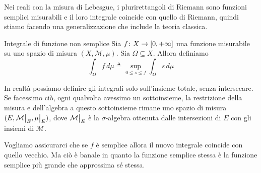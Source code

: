 \documentclass[a4paper]{article}
\begin{document}
\begin{radioactive}
Nei reali con la misura di Lebesgue, i plurirettangoli di Riemann
sono funzioni semplici misurabili e il loro integrale coincide con quello di Riemann,
quindi stiamo facendo una generalizzazione che include la teoria classica.
\end{radioactive}

\begin{radioactive}
\begin{snippetdefinition}{Integrale di funzione non semplice}
    Sia \(f \colon X \to [0, +\infty]\)
    una funzione misurabile
    su uno spazio di misura \((X, \mathcal M, \mu)\). Sia \(\Omega \subseteq X\).
    Allora definiamo
    \[
        \int_\Omega f\,d\mu \triangleq
        \sup_{0\leq s \leq f} \int_\Omega s\,d\mu
    \]
\end{snippetdefinition}
\end{radioactive}

\begin{radioactive}
In realtà possiamo definire gli integrali solo sull'insieme totale,
senza intersecare. Se facessimo ciò, ogni qualvolta avessimo un sottoinsieme,
la restrizione della misura e dell'algebra a questo sottoinsieme rimane
uno spazio di misura \((E, \restr{\mathcal M}{E}, \restr{\mu}{E})\),
dove \(\restr{\mathcal M}{E}\) è la \(\sigma\)-algebra ottenuta dalle intersezioni di \(E\)
con gli insiemi di \(\mathcal M\).
\end{radioactive}

\begin{radioactive}
Vogliamo assicurarci che se \(f\) è semplice allora il nuovo integrale coincide
con quello vecchio. Ma ciò è banale in quanto la funzione semplice stessa è la funzione
semplice più grande che approssima sé stessa.
\end{radioactive}
\end{document}
